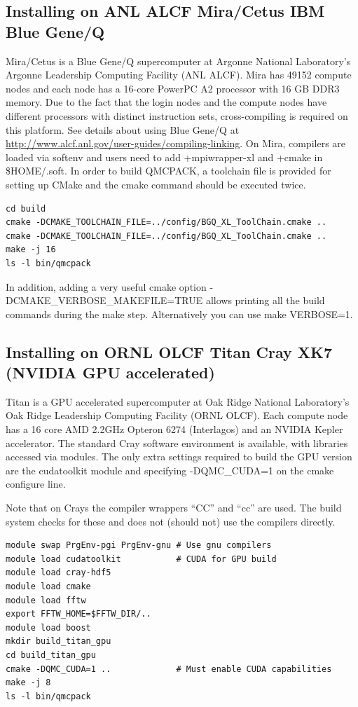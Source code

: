 \subsection{Installing on ANL ALCF Mira/Cetus IBM Blue Gene/Q}
\label{sec:buildbgq}
Mira/Cetus is a Blue Gene/Q supercomputer at Argonne National Laboratory's Argonne Leadership Computing Facility (ANL ALCF). Mira has 49152 compute nodes and each node has a 16-core PowerPC A2 processor with 16 GB DDR3 memory. Due to the fact that the login nodes and the compute nodes have different processors with distinct instruction sets, cross-compiling is required on this platform. See details about using Blue Gene/Q at \url{http://www.alcf.anl.gov/user-guides/compiling-linking}. On Mira, compilers are loaded via softenv and users need to add +mpiwrapper-xl and +cmake in \$HOME/.soft. In order to build QMCPACK, a toolchain file is provided for setting up CMake and the cmake command should be executed twice.

\begin{verbatim}
cd build
cmake -DCMAKE_TOOLCHAIN_FILE=../config/BGQ_XL_ToolChain.cmake ..
cmake -DCMAKE_TOOLCHAIN_FILE=../config/BGQ_XL_ToolChain.cmake ..
make -j 16
ls -l bin/qmcpack
\end{verbatim}

In addition, adding a very useful cmake option
-DCMAKE\_VERBOSE\_MAKEFILE=TRUE allows printing all the build commands
during the make step. Alternatively you can use make VERBOSE=1.

\subsection{Installing on ORNL OLCF Titan Cray XK7 (NVIDIA GPU
  accelerated)}
\label{sec:titanbuildgpu}
Titan is a GPU accelerated supercomputer at Oak Ridge National
Laboratory's  Oak Ridge Leadership Computing Facility  (ORNL OLCF). Each
compute node has a 16 core AMD 2.2GHz Opteron 6274 (Interlagos) and an
NVIDIA Kepler accelerator. The standard Cray software environment is
available, with libraries accessed via modules. The only extra
settings required to build the GPU version are the cudatoolkit module
and specifying -DQMC\_CUDA=1 on the cmake configure line.

Note that on Crays the compiler wrappers ``CC'' and ``cc'' are
used. The build system checks for these and does not (should not) use
the compilers directly.

\begin{verbatim}
module swap PrgEnv-pgi PrgEnv-gnu # Use gnu compilers
module load cudatoolkit           # CUDA for GPU build
module load cray-hdf5
module load cmake
module load fftw
export FFTW_HOME=$FFTW_DIR/..
module load boost
mkdir build_titan_gpu
cd build_titan_gpu
cmake -DQMC_CUDA=1 ..             # Must enable CUDA capabilities
make -j 8
ls -l bin/qmcpack
\end{verbatim}

